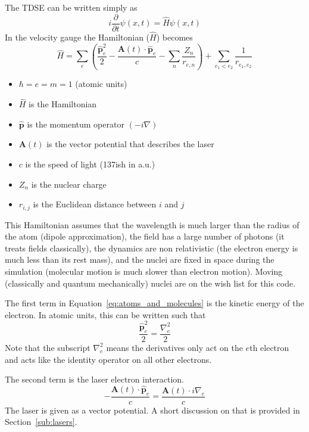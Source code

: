 \documentclass{article}
\begin{document}
The TDSE can be written simply as
\begin{equation}
    i\frac{\partial}{\partial t}\psi(x,t) = \hat{H}\psi(x,t)
\end{equation}
In the velocity gauge the Hamiltonian ($\hat{H}$) becomes
\begin{equation}
    \label{eq:atoms_and_molecules}
    \hat{H} = \sum_{e}\left(\frac{\hat{\mathbf{p}}^2_e}{2} - \frac{\mathbf{A}(t) \cdot \hat{\mathbf{p}}_e}{c} - \sum_{n} \frac{Z_n}{r_{e,n}}\right) + \sum_{e_1 < e_2}\frac{1}{r_{e_1, e_2}}
\end{equation}
\begin{itemize}
    \item $\hbar=e=m=1$ (atomic units)
    \item $\hat{H}$ is the Hamiltonian
    \item $\hat{\mathbf{p}}$ is the momentum operator $(-i\nabla)$
    \item $\mathbf{A}(t)$ is the vector potential that describes the laser
    \item $c$ is the speed of light (137ish in a.u.)
    \item $Z_n$ is the nuclear charge
    \item $r_{i,j}$ is the Euclidean distance between $i$ and $j$
\end{itemize}
This Hamiltonian assumes that the wavelength is much larger than the radius of the atom (dipole approximation), the field has a large number of photons (it treats fields classically), the dynamics are non relativistic (the electron energy is much less than its rest mass), and the nuclei are fixed in space during the simulation (molecular motion is much slower than electron motion). Moving (classically and quantum mechanically) nuclei are on the wish list for this code.

The first term in Equation~\ref{eq:atoms_and_molecules} is the kinetic energy of the electron. In atomic units, this can be written such that
\begin{equation}
  \frac{\hat{\mathbf{p}}^2_e}{2} = \frac{\nabla_e^2}{2}
\end{equation}
Note that the subscript $\nabla_e^2$ means the derivatives only act on the $e$th electron and acts like the identity operator on all other electrons.

The second term is the laser electron interaction.
\begin{equation}
  - \frac{\mathbf{A}(t) \cdot \hat{\mathbf{p}}_e}{c} = \frac{\mathbf{A}(t) \cdot i\nabla_e}{c}
\end{equation}
The laser is given as a vector potential. A short discussion on that is provided in Section~\ref{sub:lasers}.
\end{document}
